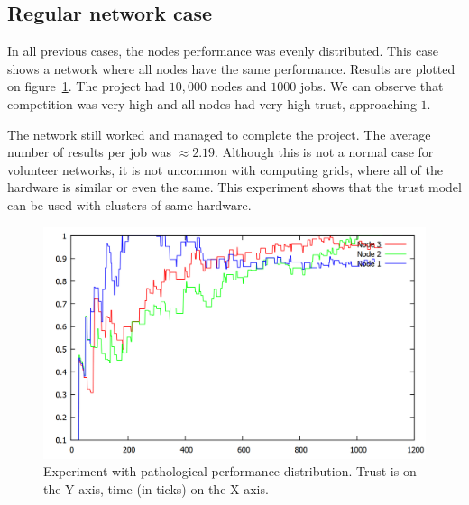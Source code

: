 \subsection{Regular network case}

In all previous cases, the nodes performance was evenly distributed. This case shows a network where all nodes have the same performance. Results are plotted on figure~\ref{f:evenly}. The project had $10,000$ nodes and $1000$ jobs. We can observe that competition was very high and all nodes had very high trust, approaching $1$.

The network still worked and managed to complete the project. The average number of results per job was $\approx 2.19$. Although this is not a normal case for volunteer networks, it is not uncommon with computing grids, where all of the hardware is similar or even the same. This experiment shows that the trust model can be used with clusters of same hardware.

\begin{figure}
\centering
\includegraphics[width=\textwidth]{diagrams/trust_static.png}
\caption{Experiment with pathological performance distribution. Trust is on the Y axis, time (in ticks) on the X axis.}
\label{f:evenly}
\end{figure}